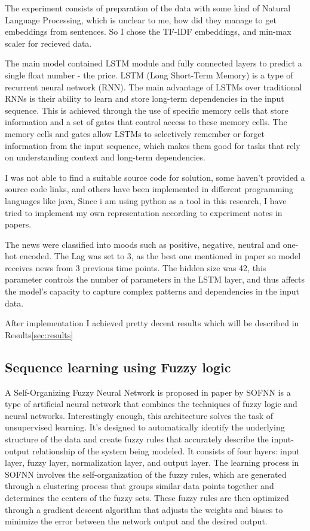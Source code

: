 \documentclass{article}
\begin{document}
The experiment consists of preparation of the data with some kind of Natural Language Processing, which is unclear to me, how did they manage to get embeddings from sentences. So I chose the TF-IDF embeddings, and min-max scaler for recieved data.

The main model contained LSTM \cite{HochSchm97} module and fully connected layers to predict a single float number - the price.
LSTM (Long Short-Term Memory) is a type of recurrent neural network (RNN). The main advantage of LSTMs over traditional RNNs is their ability to learn and store long-term dependencies in the input sequence. This is achieved through the use of specific memory cells that store information and a set of gates that control access to these memory cells. 
The memory cells and gates allow LSTMs to selectively remember or forget information from the input sequence, which makes them good for tasks that rely on understanding context and long-term dependencies.

I was not able to find a suitable source code for solution, some haven't provided a source code links, and others have been implemented in different programming languages like java, 
Since i am using python as a tool in this research, I have tried to implement my own representation according to experiment notes in papers.

The news were classified into moods such as positive, negative, neutral and one-hot encoded.
The Lag was set to 3, as the best one mentioned in paper so model receives news from 3 previous time points. The hidden size was 42, this parameter controls the number of parameters in the LSTM layer, and thus affects the model's capacity to capture complex patterns and dependencies in the input data.

After implementation I achieved pretty decent results which will be described in Results\ref{sec:results}

\subsection{Sequence learning using Fuzzy logic}

A Self-Organizing Fuzzy Neural Network is proposed in paper by \cite{SalimiBadr2022}
SOFNN is a type of artificial neural network that combines the techniques of fuzzy logic and neural networks.
Interestingly enough, this architecture solves the task of unsupervised learning.
It's designed to automatically identify the underlying structure of the data and create fuzzy rules that accurately describe the input-output relationship of the system being modeled. It consists of four layers: input layer, fuzzy layer, normalization layer, and output layer.
The learning process in SOFNN involves the self-organization of the fuzzy rules, which are generated through a clustering process that groups similar data points together and determines the centers of the fuzzy sets. 
These fuzzy rules are then optimized through a gradient descent algorithm that adjusts the weights and biases to minimize the error between the network output and the desired output.
\end{document}

